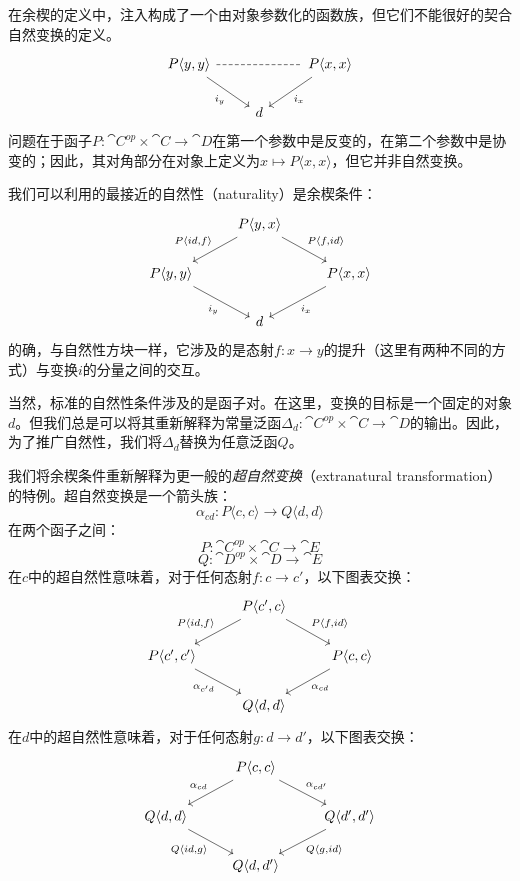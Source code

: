 \documentclass[DaoFP]{subfiles}
\begin{document}
 在余楔的定义中，注入构成了一个由对象参数化的函数族，但它们不能很好的契合自然变换的定义。
 \[
  \begin{tikzcd}
   P \langle y, y \rangle
   \arrow[dr, "i_y"']
   \arrow[rr, dash, dashed]
   &&P \langle x, x \rangle
   \arrow[dl, "i_x"]
   \\
   &d
  \end{tikzcd}
 \]
 问题在于函子$P \colon \cat C^{op} \times \cat C \to \cat D$在第一个参数中是反变的，在第二个参数中是协变的；因此，其对角部分在对象上定义为$x \mapsto P \langle x, x \rangle$，但它并非自然变换。

 我们可以利用的最接近的自然性（naturality）是余楔条件：
 \[
  \begin{tikzcd}
   &P \langle y, x \rangle
   \arrow[ld, "{P \langle id, f \rangle}"']
   \arrow[rd, "{P \langle f, id \rangle}"]
   \\
   P \langle y, y \rangle
   \arrow[dr, "i_y"']
   &&P \langle x, x \rangle
   \arrow[dl, "i_x"]
   \\
   &d
  \end{tikzcd}
 \]
 的确，与自然性方块一样，它涉及的是态射$f \colon x \to y$的提升（这里有两种不同的方式）与变换$i$的分量之间的交互。

 当然，标准的自然性条件涉及的是函子对。在这里，变换的目标是一个固定的对象$d$。但我们总是可以将其重新解释为常量泛函$\Delta_d \colon \cat C^{op} \times \cat C \to \cat D$的输出。因此，为了推广自然性，我们将$\Delta_d$替换为任意泛函$Q$。

 我们将余楔条件重新解释为更一般的\emph{超自然变换}（extranatural transformation）的特例。超自然变换是一个箭头族：
 \[ \alpha_{c d} \colon P \langle c, c \rangle \to Q \langle d, d \rangle \]
 在两个函子之间：
 \[ P \colon \cat C^{op} \times \cat C \to \cat E \]
 \[ Q \colon \cat D^{op} \times \cat D \to \cat E \]
 在$c$中的超自然性意味着，对于任何态射$f \colon c \to c'$，以下图表交换：
 \[
  \begin{tikzcd}
   &P \langle c', c \rangle
   \arrow[ld, "{P \langle id, f \rangle}"']
   \arrow[rd, "{P \langle f, id \rangle}"]
   \\
   P \langle c', c' \rangle
   \arrow[dr, "\alpha_{c' d}"']
   &&P \langle c, c \rangle
   \arrow[dl, "\alpha_{c d}"]
   \\
   & Q \langle d, d \rangle
  \end{tikzcd}
 \]
 在$d$中的超自然性意味着，对于任何态射$g \colon d \to d'$，以下图表交换：
 \[
  \begin{tikzcd}
   &P \langle c, c \rangle
   \arrow[ld, "\alpha_{c d}"']
   \arrow[rd, "\alpha_{c d'}"]
   \\
   Q \langle d, d \rangle
   \arrow[dr, "{Q \langle id, g\rangle}"']
   &&Q \langle d', d' \rangle
   \arrow[dl, "{Q \langle g,  id\rangle}"]
   \\
   & Q \langle d, d' \rangle
  \end{tikzcd}
 \]
\end{document}
